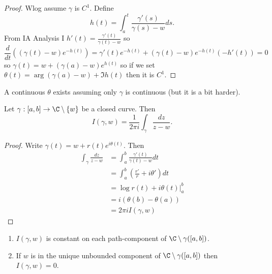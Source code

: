 \documentclass[a4paper]{article}
\begin{document}
\begin{proof}
  Wlog assume \(\gamma\) is \(C^1\). Define
  \[
    h(t) = \int_a^t \frac{\gamma'(s)}{\gamma(s) - w} ds.
  \]
  From IA Analysis I \(h'(t) = \frac{\gamma'(t)}{\gamma(t) - w}\) so
  \[
    \frac{d}{dt} \left( (\gamma(t) - w) e^{-h(t)} \right)
    = \gamma'(t)e^{-h(t)} + (\gamma(t) - w)e^{-h(t)}(-h'(t))
    =0
  \]
  so \(\gamma(t) = w + (\gamma(a) - w)e^{h(t)}\) so if we set \(\theta(t) = \arg (\gamma(a) - w) + \Im h(t)\) then it is \(C^1\).
\end{proof}

\begin{remark}
  A continuous \(\theta\) exists assuming only \(\gamma\) is continuous (but it is a bit harder).
\end{remark}

\begin{lemma}
  Let \(\gamma: [a, b] \to \C \setminus \{w\}\) be a closed curve. Then
  \[
    I(\gamma, w) = \frac{1}{2\pi i} \int_\gamma \frac{dz}{z - w}.
  \]
\end{lemma}

\begin{proof}
  Write \(\gamma(t) = w + r(t)e^{i\theta(t)}\). Then
  \begin{align*}
    \int_\gamma \frac{dz}{z - w}
    &= \int_a^b \frac{\gamma'(t)}{\gamma(t) - w} dt \\
    &= \int_a^b (\frac{r'}{r} + i\theta') dt \\
    &= \log r(t) + i\theta(t) \big|_a^b \\
    &= i(\theta(b) - \theta(a)) \\
    &= 2\pi i I(\gamma, w)
  \end{align*}
\end{proof}

\begin{lemma}\leavevmode
  \begin{enumerate}
  \item \(I(\gamma, w)\) is constant on each path-component of \(\C \setminus \gamma([a, b])\).
  \item If \(w\) is in the unique unbounded component of \(\C \setminus \gamma([a, b])\) then \(I(\gamma,w) = 0\).
  \end{enumerate}
\end{lemma}
\end{document}
